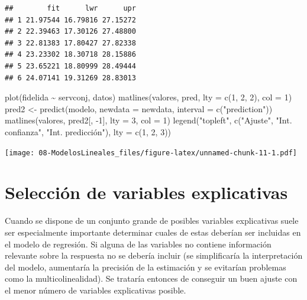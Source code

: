 \documentclass[
]{book}
\newenvironment{Shaded}{\begin{snugshade}}{\end{snugshade}}
\newcommand{\AttributeTok}[1]{\textcolor[rgb]{0.77,0.63,0.00}{#1}}
\newcommand{\DecValTok}[1]{\textcolor[rgb]{0.00,0.00,0.81}{#1}}
\newcommand{\FunctionTok}[1]{\textcolor[rgb]{0.00,0.00,0.00}{#1}}
\newcommand{\NormalTok}[1]{#1}
\newcommand{\OtherTok}[1]{\textcolor[rgb]{0.56,0.35,0.01}{#1}}
\newcommand{\SpecialCharTok}[1]{\textcolor[rgb]{0.00,0.00,0.00}{#1}}
\newcommand{\StringTok}[1]{\textcolor[rgb]{0.31,0.60,0.02}{#1}}
\theoremstyle{break}
\begin{document}
\begin{verbatim}
##        fit      lwr      upr
## 1 21.97544 16.79816 27.15272
## 2 22.39463 17.30126 27.48800
## 3 22.81383 17.80427 27.82338
## 4 23.23302 18.30718 28.15886
## 5 23.65221 18.80999 28.49444
## 6 24.07141 19.31269 28.83013
\end{verbatim}

\begin{Shaded}
\begin{Highlighting}[]
\FunctionTok{plot}\NormalTok{(fidelida }\SpecialCharTok{\textasciitilde{}}\NormalTok{ servconj, datos)}
\FunctionTok{matlines}\NormalTok{(valores, pred, }\AttributeTok{lty =} \FunctionTok{c}\NormalTok{(}\DecValTok{1}\NormalTok{, }\DecValTok{2}\NormalTok{, }\DecValTok{2}\NormalTok{), }\AttributeTok{col =} \DecValTok{1}\NormalTok{)}
\NormalTok{pred2 }\OtherTok{\textless{}{-}} \FunctionTok{predict}\NormalTok{(modelo, }\AttributeTok{newdata =}\NormalTok{ newdata, }\AttributeTok{interval =} \FunctionTok{c}\NormalTok{(}\StringTok{"prediction"}\NormalTok{))}
\FunctionTok{matlines}\NormalTok{(valores, pred2[, }\SpecialCharTok{{-}}\DecValTok{1}\NormalTok{], }\AttributeTok{lty =} \DecValTok{3}\NormalTok{, }\AttributeTok{col =} \DecValTok{1}\NormalTok{)}
\FunctionTok{legend}\NormalTok{(}\StringTok{"topleft"}\NormalTok{, }\FunctionTok{c}\NormalTok{(}\StringTok{"Ajuste"}\NormalTok{, }\StringTok{"Int. confianza"}\NormalTok{, }\StringTok{"Int. predicción"}\NormalTok{), }\AttributeTok{lty =} \FunctionTok{c}\NormalTok{(}\DecValTok{1}\NormalTok{, }\DecValTok{2}\NormalTok{, }\DecValTok{3}\NormalTok{))}
\end{Highlighting}
\end{Shaded}

\texttt{[image: 08-ModelosLineales\_files/figure-latex/unnamed-chunk-11-1.pdf]}

\hypertarget{selecciuxf3n-de-variables-explicativas}{%
\section{Selección de variables explicativas}\label{selecciuxf3n-de-variables-explicativas}}

Cuando se dispone de un conjunto grande de posibles variables explicativas
suele ser especialmente importante determinar cuales de estas deberían ser
incluidas en el modelo de regresión.
Si alguna de las variables no contiene información relevante sobre la respuesta
no se debería incluir (se simplificaría la interpretación del modelo, aumentaría
la precisión de la estimación y se evitarían problemas como la multicolinealidad).
Se trataría entonces de conseguir un buen ajuste con el menor número de variables explicativas posible.
\end{document}
